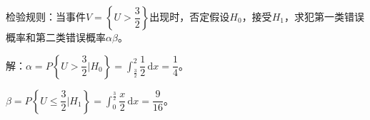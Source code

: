 检验规则：当事件$V=\left\{U>\dfrac{3}{2}\right\}$出现时，否定假设$H_0$，接受$H_1$，求犯第一类错误概率和第二类错误概率$\alpha\beta$。

解：$\alpha=P\left\{U>\dfrac{3}{2}\bigg|H_0\right\}=\displaystyle{\int_\frac{3}{2}^2\dfrac{1}{2}\,\textrm{d}x=\dfrac{1}{4}}$。

$\beta=P\left\{U\leqslant\dfrac{3}{2}\bigg|H_1\right\}=\displaystyle{\int_0^{\frac{3}{2}}\dfrac{x}{2}\,\textrm{d}x=\dfrac{9}{16}}$。

%
